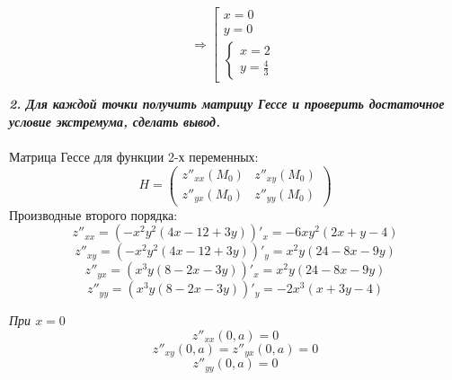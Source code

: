 \documentclass[a5paper, 10pt]{article}
\theoremstyle{definition}
\theoremstyle{plain}
\theoremstyle{remark}
\begin{document}
\begin{equation}
\Rightarrow
\left[
\begin{array}{c}
x = 0\\
y = 0\\
\begin{cases}
x = 2\\
y = \frac{4}{3} 
\end{cases}
\end{array}
\right.
\end{equation}









\textit{\textbf{2. Для каждой точки получить матрицу Гессе и проверить достаточное условие экстремума, сделать вывод.}}\\
\\
Матрица Гессе для функции 2-х переменных:\\
\begin{equation}
H = 
\begin{pmatrix}
z''_{xx} \left(M_0 \right) & z''_{xy}  \left(M_0 \right)\\
z''_{yx}  \left(M_0 \right) & z''_{yy}  \left(M_0 \right)
\end{pmatrix}
\end{equation}
Производные второго порядка:\\
\begin{equation}
z''_{xx} = \left( -x^2y^2 (4x - 12+3y) \right)'_x = -6xy^2(2x+y-4)
\end{equation}
\begin{equation}
z''_{xy} = \left( -x^2y^2 (4x - 12+3y) \right)'_y = x^2y(24-8x-9y)
\end{equation}
\begin{equation}
z''_{yx} = \left( x^3y(8-2x-3y)\right)'_x = x^2y(24-8x-9y)
\end{equation}
\begin{equation}
z''_{yy} = \left( x^3y(8-2x-3y)\right)'_y = -2x^3(x+3y-4)
\end{equation}


\textit{При $x = 0$}
\begin{equation}
z''_{xx} \left(0, a \right)  = 0
\end{equation}
\begin{equation}
z''_{xy} \left(0, a \right) = z''_{yx}\left(0, a \right)  = 0
\end{equation}
\begin{equation}
z''_{yy} \left(0, a \right)= 0
\end{equation}
\end{document}
